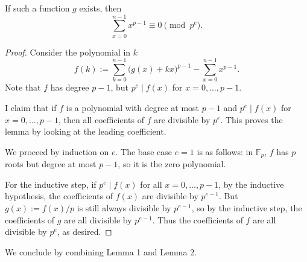 \begin{lemma}
    If such a function $g$ exists, then \[\sum_{x=0}^{n-1}x^{p-1}\equiv0\pmod{p^e}.\]
\end{lemma}
\begin{proof}
    Consider the polynomial in $k$ \[f(k):=\sum_{k=0}^{n-1}\Big(g(x)+kx\Big)^{p-1}-\sum_{x=0}^{n-1}x^{p-1}.\]
    Note that $f$ has degree $p-1$, but $p^e\mid f(x)$ for $x=0,\ldots,p-1$.

    I claim that if $f$ is a polynomial with degree at most $p-1$ and $p^e\mid f(x)$ for $x=0,\ldots,p-1$, then all coefficients of $f$ are divisible by $p^e$. This proves the lemma by looking at the leading coefficient.

    We proceed by induction on $e$. The base case $e=1$ is as follows: in $\mathbb F_p$, $f$ has $p$ roots but degree at most $p-1$, so it is the zero polynomial.

    For the inductive step, if $p^e\mid f(x)$ for all $x=0,\ldots,p-1$, by the inductive hypothesis, the coefficients of $f(x)$ are divisible by $p^{e-1}$. But $g(x):=f(x)/p$ is still always divisible by $p^{e-1}$, so by the inductive step, the coefficients of $g$ are all divisible by $p^{e-1}$. Thus the coefficients of $f$ are all divisible by $p^e$, as desired.
\end{proof}

We conclude by combining Lemma 1 and Lemma 2.

